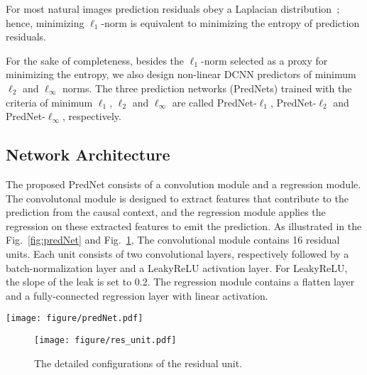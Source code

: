 \documentclass{article}
\begin{document}
For most natural images prediction residuals obey a Laplacian distribution~\cite{laplacian}; hence, minimizing $\ell_1$-norm is equivalent to minimizing the entropy of prediction residuals.

For the sake of completeness, besides the $\ell_1$-norm selected as a proxy for minimizing the entropy, we also design non-linear DCNN predictors of minimum $\ell_2$ and $\ell_\infty$ norms. The three prediction networks (PredNets) trained with the criteria of minimum $\ell_1$, $\ell_2$ and $\ell_\infty$ are called PredNet-$\ell_1$, PredNet-$\ell_2$ and PredNet-$\ell_\infty$, respectively.


\subsection{Network Architecture}
The proposed PredNet consists of a convolution module and a regression module.
The convolutonal module is designed to extract features that contribute to the prediction from the causal context, and the regression module applies the regression on these extracted features to emit the prediction.
As illustrated in the Fig.~\ref{fig:predNet} and Fig.~\ref{fig:res_unit},
The convolutional module contains 16 residual units. Each unit consists of two convolutional layers, respectively followed by a batch-normalization layer and a LeakyReLU activation layer. For LeakyReLU, the slope of the leak is set to 0.2.
The regression module contains a flatten layer and a fully-connected regression layer with linear activation.

\begin{figure*}[h]
	\centering
	\texttt{[image: figure/predNet.pdf]}
	\caption{The architecture of the deep prediction network (PredNet).}
	\label{fig:predNet}
\end{figure*}
\begin{figure}[h]
	\centering
	\texttt{[image: figure/res\_unit.pdf]}
	\caption{The detailed configurations of the residual unit.}
	\label{fig:res_unit}
\end{figure}
\end{document}

